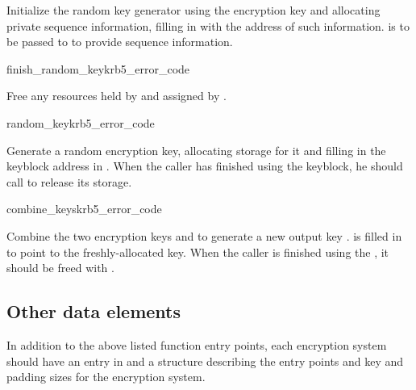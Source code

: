 Initialize the random key generator using the encryption key
 and allocating private sequence information, filling
in  with the address of such information.
 is to be passed to  to provide
sequence information.

\begin{funcdecl}{finish_random_key}{krb5_error_code}{\funcvoid}
\end{funcdecl}

Free any resources held by  and assigned by
. 

\begin{funcdecl}{random_key}{krb5_error_code}{\funcvoid}
\end{funcdecl}

Generate a random encryption key, allocating storage for it and
filling in the keyblock address in .
When the caller has finished using the keyblock, he should call
 to release its storage.

\begin{funcdecl}{combine_keys}{krb5_error_code}{\funcin}
\funcout
{}
\end{funcdecl}
Combine the two encryption keys  and  to
generate a new output key .   is
filled in to point to the freshly-allocated key.  When the caller is
finished using the , it should be freed with
.

\subsection{Other data elements}
In addition to the above listed function entry points, each encryption
system should have an entry in  and a
 structure describing the entry points
and key and padding sizes for the encryption system.
